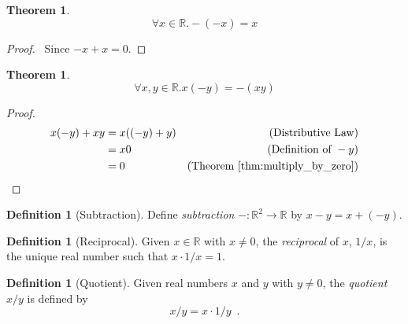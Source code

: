 \documentclass{report}
\let\qed\relax
\newtheorem{thm}[ax]{Theorem}
\theoremstyle{definition}
\newtheorem{df}[ax]{Definition}
\begin{document}
\begin{thm}
\[ \forall x \in \mathbb{R}. -(-x) = x \]
\end{thm}

\begin{proof}
\pf\ Since $-x + x = 0$. \qed
\end{proof}

\begin{thm}
\[ \forall x,y \in \mathbb{R}. x(-y) = -(xy) \]
\end{thm}

\begin{proof}
\pf
\begin{align*}
x(-y) + xy & = x((-y)+y) & (\text{Distributive Law}) \\
& = x0 & (\text{Definition of } -y) \\
& = 0 & (\text{Theorem \ref{thm:multiply_by_zero}}) \qed
\end{align*}
\end{proof}

\begin{df}[Subtraction]
Define \emph{subtraction} $- : \mathbb{R}^2 \rightarrow \mathbb{R}$ by $x - y = x + (-y)$.
\end{df}

\begin{df}[Reciprocal]
Given $x \in \mathbb{R}$ with $x \neq 0$, the \emph{reciprocal} of $x$, $1/x$, is the unique real number such that $x \cdot 1/x = 1$.
\end{df}

\begin{df}[Quotient]
Given real numbers $x$ and $y$ with $y \neq 0$, the \emph{quotient} $x/y$ is defined by
\[ x/y = x \cdot 1/y \enspace . \]
\end{df}
\end{document}
